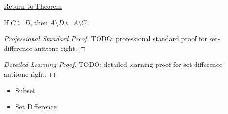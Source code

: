 \newpage
{}
\label{prf:set-difference-antitone-right}

\begin{remark*}[Return]
\hyperref[thm:set-difference-antitone-right]{Return to Theorem}
\end{remark*}

\begin{theorem*}
If $C\subseteq D$, then $A\setminus D\subseteq A\setminus C$.
\end{theorem*}

\begin{proof}[Professional Standard Proof]
\LRAProofBodyStart
TODO: professional standard proof for set-difference-antitone-right.
\end{proof}

\begin{proof}[Detailed Learning Proof]
\LRAProofBodyStart
TODO: detailed learning proof for set-difference-antitone-right.
\end{proof}

\begin{remark*}
\end{remark*}

\begin{dependencies}
\begin{itemize}
  \item \hyperref[def:subset]{Subset}
  \item \hyperref[def:set-difference]{Set Difference}
\end{itemize}
\end{dependencies}

\clearpage
